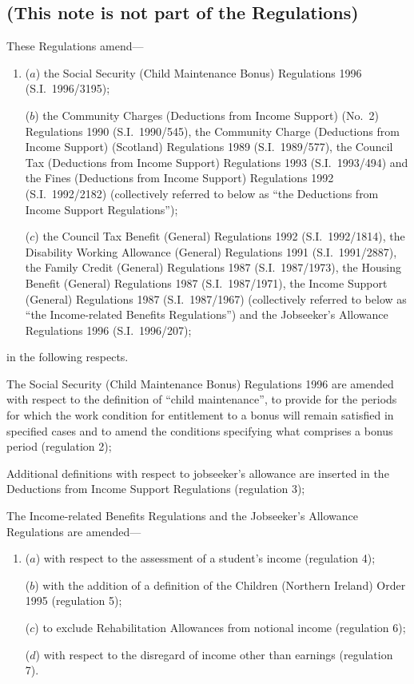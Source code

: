 \documentclass[12pt,a4paper]{article}
\begin{document}
\renewcommand\parthead{--- Explanatory Note}

\subsection*{(This note is not part of the Regulations)}

These Regulations amend—
\begin{enumerate}\item[]
($a$) the Social Security (Child Maintenance Bonus) Regulations 1996 (S.I.\ 1996/3195);

($b$) the Community Charges (Deductions from Income Support) (No.\ 2) Regulations 1990 (S.I.\ 1990/545), the Community Charge (Deductions from Income Support) (Scotland) Regulations 1989 (S.I.\ 1989/577), the Council Tax (Deductions from Income Support) Regulations 1993 (S.I.\ 1993/494) and the Fines (Deductions from Income Support) Regulations 1992 (S.I.\ 1992/2182) (collectively referred to below as “the Deductions from Income Support Regulations”);

($c$) the Council Tax Benefit (General) Regulations 1992 (S.I.\ 1992/1814), the Disability Working Allowance (General) Regulations 1991 (S.I.\ 1991/2887), the Family Credit (General) Regulations 1987 (S.I.\ 1987/1973), the Housing Benefit (General) Regulations 1987 (S.I.\ 1987/1971), the Income Support (General) Regulations 1987 (S.I.\ 1987/1967) (collectively referred to below as “the Income-related Benefits Regulations”) and the Jobseeker’s Allowance Regulations 1996 (S.I.\ 1996/207);
\end{enumerate}
in the following respects.

The Social Security (Child Maintenance Bonus) Regulations 1996 are amended with respect to the definition of “child maintenance”, to provide for the periods for which the work condition for entitlement to a bonus will remain satisfied in specified cases and to amend the conditions specifying what comprises a bonus period (regulation 2);

Additional definitions with respect to jobseeker’s allowance are inserted in the Deductions from Income Support Regulations (regulation 3);

The Income-related Benefits Regulations and the Jobseeker’s Allowance Regulations are amended—
\begin{enumerate}\item[]
($a$) with respect to the assessment of a student’s income (regulation 4);

($b$) with the addition of a definition of the Children (Northern Ireland) Order 1995 (regulation 5);

($c$) to exclude Rehabilitation Allowances from notional income (regulation 6);

($d$) with respect to the disregard of income other than earnings (regulation 7).
\end{enumerate}
\end{document}
